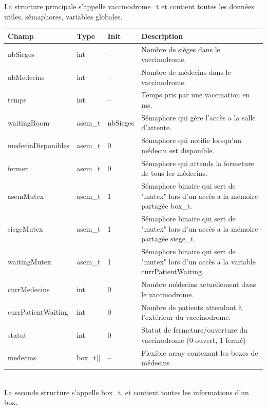 \documentclass[a4paper]{article}
\begin{document}
  La structure principale s'appelle vaccinodrome\_t et contient toutes les données utiles,
  sémaphores, variables globales.

  \begin{tabularx}{\linewidth}{|l|l|l|X|}
    \hline
    Champ & Type & Init & Description \\ \hline%
    nbSieges & int & -- & Nombre de sièges dans le vaccinodrome. \\ \hline%
    nbMedecins & int & -- & Nombre de médecins dans le vaccinodrome. \\ \hline%
    temps & int & -- & Temps pris par une vaccination en ms. \\ \hline%

    waitingRoom & asem\_t & nbSieges & Sémaphore qui gère l'accès a la salle d'attente. \\ \hline%
    medecinDisponibles & asem\_t & 0 & Sémaphore qui notifie lorsqu'un médecin est disponible. \\ \hline%
    fermer & asem\_t & 0 & Sémaphore qui attends la fermeture de tous les médecins. \\ \hline%

    asemMutex & asem\_t & 1 & Sémaphore binaire qui sert de "mutex" lors d'un accès a la mémoire partagée box\_t. \\ \hline%
    siegeMutex & asem\_t & 1 & Sémaphore binaire qui sert de "mutex" lors d'un accès a la mémoire partagée siege\_t. \\ \hline%
    waitingMutex & asem\_t & 1 & Sémaphore binaire qui sert de "mutex" lors d'un accès a la variable currPatientWaiting. \\ \hline%

    currMedecins & int & 0 & Nombre médecins actuellement dans le vaccinodrome. \\ \hline%
    currPatientWaiting & int & 0 & Nombre de patients attendant à l'extérieur du vaccinodrome. \\ \hline%
    statut & int & 0 & Statut de fermeture/ouverture du vaccinodrome (0 ouvert, 1 fermé) \\ \hline%
    medecins & box\_t[] & -- & Flexible array contenant les boxes de médecins \\ \hline%

  \end{tabularx}
  \\[12pt]
  La seconde structure s'appelle box\_t, et contient toutes les informations d'un box.
\end{document}
